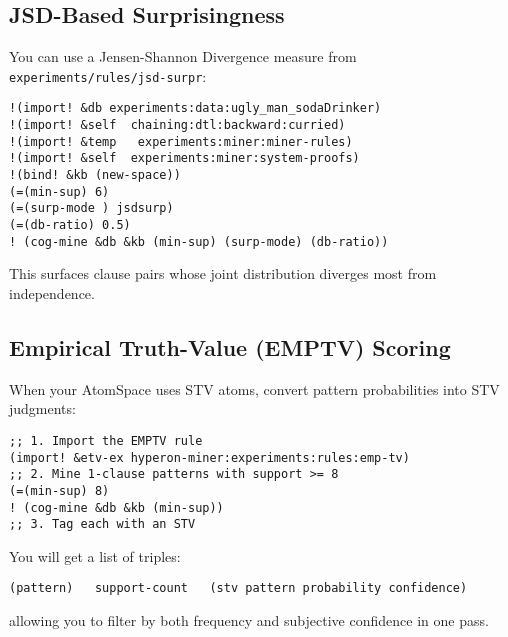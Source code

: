 \documentclass{article}
\begin{document}
\subsection{JSD-Based Surprisingness}

You can use a Jensen-Shannon Divergence measure from \texttt{experiments/rules/jsd-surpr}:

\begin{verbatim}
!(import! &db experiments:data:ugly_man_sodaDrinker)
!(import! &self  chaining:dtl:backward:curried)
!(import! &temp   experiments:miner:miner-rules)
!(import! &self  experiments:miner:system-proofs)
!(bind! &kb (new-space))
(=(min-sup) 6)
(=(surp-mode ) jsdsurp)
(=(db-ratio) 0.5)
! (cog-mine &db &kb (min-sup) (surp-mode) (db-ratio))
\end{verbatim}

This surfaces clause pairs whose joint distribution diverges most from independence.

\subsection{Empirical Truth-Value (EMPTV) Scoring}

When your AtomSpace uses STV atoms, convert pattern probabilities into STV judgments:

\begin{verbatim}
;; 1. Import the EMPTV rule
(import! &etv-ex hyperon-miner:experiments:rules:emp-tv)
;; 2. Mine 1-clause patterns with support >= 8
(=(min-sup) 8)
! (cog-mine &db &kb (min-sup))
;; 3. Tag each with an STV
\end{verbatim}

You will get a list of triples:

\begin{verbatim}
(pattern)   support-count   (stv pattern probability confidence)
\end{verbatim}

allowing you to filter by both frequency and subjective confidence in one pass.
\end{document}

